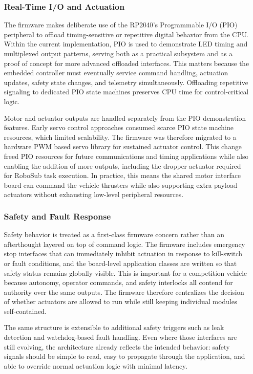 \documentclass[conference]{IEEEtran}
\begin{document}
\subsubsection{Real-Time I/O and Actuation}

The firmware makes deliberate use of the RP2040's Programmable I/O (PIO) peripheral to offload timing-sensitive or repetitive digital behavior from the CPU. Within the current implementation, PIO is used to demonstrate LED timing and multiplexed output patterns, serving both as a practical subsystem and as a proof of concept for more advanced offloaded interfaces. This matters because the embedded controller must eventually service command handling, actuation updates, safety state changes, and telemetry simultaneously. Offloading repetitive signaling to dedicated PIO state machines preserves CPU time for control-critical logic.

Motor and actuator outputs are handled separately from the PIO demonstration features. Early servo control approaches consumed scarce PIO state machine resources, which limited scalability. The firmware was therefore migrated to a hardware PWM based servo library for sustained actuator control. This change freed PIO resources for future communications and timing applications while also enabling the addition of more outputs, including the dropper actuator required for RoboSub task execution. In practice, this means the shared motor interface board can command the vehicle thrusters while also supporting extra payload actuators without exhausting low-level peripheral resources.

\subsubsection{Safety and Fault Response}

Safety behavior is treated as a first-class firmware concern rather than an afterthought layered on top of command logic. The firmware includes emergency stop interfaces that can immediately inhibit actuation in response to kill-switch or fault conditions, and the board-level application classes are written so that safety status remains globally visible. This is important for a competition vehicle because autonomy, operator commands, and safety interlocks all contend for authority over the same outputs. The firmware therefore centralizes the decision of whether actuators are allowed to run while still keeping individual modules self-contained.

The same structure is extensible to additional safety triggers such as leak detection and watchdog-based fault handling. Even where those interfaces are still evolving, the architecture already reflects the intended behavior: safety signals should be simple to read, easy to propagate through the application, and able to override normal actuation logic with minimal latency.
\end{document}
